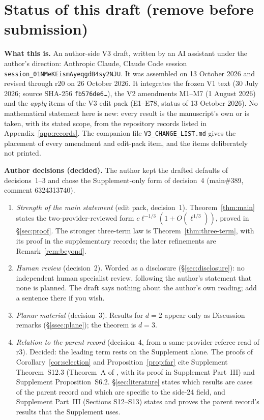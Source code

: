 \section*{Status of this draft (remove before submission)}

\noindent\textbf{What this is.} An author-side V3 draft, written by an AI assistant under the author's direction: Anthropic Claude, Claude Code session \texttt{session\_01NMeKEismAyeqgdB4sy2NJU}. It was assembled on 13 October 2026 and revised through r20 on 26 October 2026. It integrates the frozen V1 text (30 July 2026; source SHA-256 \texttt{fb576de6\ldots}), the V2 amendments M1--M7 (1 August 2026) and the \emph{apply} items of the V3 edit pack (E1--E78, status of 13 October 2026). No mathematical statement here is new: every result is the manuscript's own or is taken, with its stated scope, from the repository records listed in Appendix~\ref{app:records}. The companion file \texttt{V3\_CHANGE\_LIST.md} gives the placement of every amendment and edit-pack item, and the items deliberately not printed.

\smallskip
\noindent\textbf{Author decisions (decided).} The author kept the drafted defaults of decisions~1--3 and chose the Supplement-only form of decision~4 (main\#389, comment 6324313740).
\begin{enumerate}[leftmargin=2em]
\item \emph{Strength of the main statement} (edit pack, decision~1). Theorem~\ref{thm:main} states the two-provider-reviewed form $c\ell^{-1/3}(1+O(\ell^{1/3}))$, proved in \S\ref{sec:proof}. The stronger three-term law is Theorem~\ref{thm:three-term}, with its proof in the supplementary records; the later refinements are Remark~\ref{rem:beyond}.
\item \emph{Human review} (decision~2). Worded as a disclosure (\S\ref{sec:disclosure}): no independent human specialist review, following the author's statement that none is planned. The draft says nothing about the author's own reading; add a sentence there if you wish.
\item \emph{Planar material} (decision~3). Results for $d=2$ appear only as Discussion remarks (\S\ref{ssec:plane}); the theorem is $d=3$.
\item \emph{Relation to the parent record} (decision~4, from a same-provider referee read of r3). Decided: the leading term rests on the Supplement alone. The proofs of Corollary~\ref{cor:selection} and Proposition~\ref{prop:far} cite Supplement Theorem~S12.3 (Theorem~A of , with its proof in Supplement Part~III) and Supplement Proposition~S6.2. \S\ref{sec:literature} states which results are cases of the parent record and which are specific to the side-24 field, and Supplement Part~III (Sections S12--S13) states and proves the parent record's results that the Supplement uses.
\end{enumerate}

